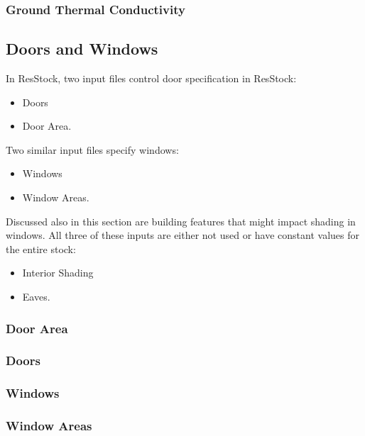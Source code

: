 \subsubsection{Ground Thermal Conductivity}\label{ground_thermal_conductivity}


\subsection{Doors and Windows}
In ResStock, two input files control door specification in ResStock:
\begin{itemize}
    \item Doors
    \item Door Area.
\end{itemize}

Two similar input files specify windows:
\begin{itemize}
    \item Windows
    \item Window Areas.
\end{itemize}

Discussed also in this section are building features that might impact shading in windows. All three of these inputs are either not used or have constant values for the entire stock:
\begin{itemize}
    \item Interior Shading
    \item Eaves.
\end{itemize}

\subsubsection{Door Area}\label{door_area}


\subsubsection{Doors}\label{doors}


\subsubsection{Windows}\label{windows}


\subsubsection{Window Areas}\label{window_areas}


